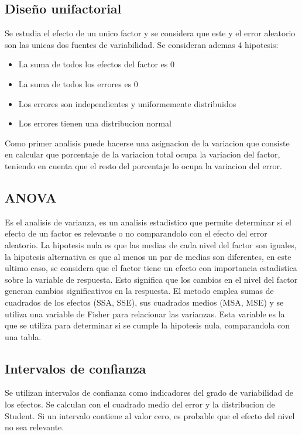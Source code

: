 \documentclass[a4paper]{article}
\begin{document}
\subsection*{Diseño unifactorial}
Se estudia el efecto de un unico factor y se considera que este y el error aleatorio son las unicas dos fuentes de
variabilidad.
Se consideran ademas 4 hipotesis:
\begin{itemize}
    \item La suma de todos los efectos del factor es 0
    \item La suma de todos los errores es 0
    \item Los errores son independientes y uniformemente distribuidos
    \item Los errores tienen una distribucion normal
\end{itemize}
Como primer analisis puede hacerse una asignacion de la variacion que consiste en calcular que porcentaje de 
la variacion total ocupa la variacion del factor, teniendo en cuenta que el resto del porcentaje lo ocupa 
la variacion del error.

\subsection*{ANOVA}
Es el analisis de varianza, es un analisis estadistico que permite determinar si el efecto de un factor es 
relevante o no comparandolo con el efecto del error aleatorio.
La hipotesis nula es que las medias de cada nivel del factor son iguales, la hipotesis alternativa es que 
al menos un par de medias son diferentes, en este ultimo caso, se considera que el factor tiene un efecto con 
importancia estadistica sobre la variable de respuesta. Esto significa que los cambios en el nivel del factor 
generan cambios significativos en la respuesta.
El metodo emplea sumas de cuadrados de los efectos (SSA, SSE), sus cuadrados medios (MSA, MSE) y se utiliza una 
variable de Fisher para relacionar las varianzas. Esta variable es la que se utiliza para determinar si se 
cumple la hipotesis nula, comparandola con una tabla.

\subsection*{Intervalos de confianza}
Se utilizan intervalos de confianza como indicadores del grado de variabilidad de los efectos.
Se calculan con el cuadrado medio del error y la distribucion de Student. Si un intervalo 
contiene al valor cero, es probable que el efecto del nivel no sea relevante.
\end{document}
